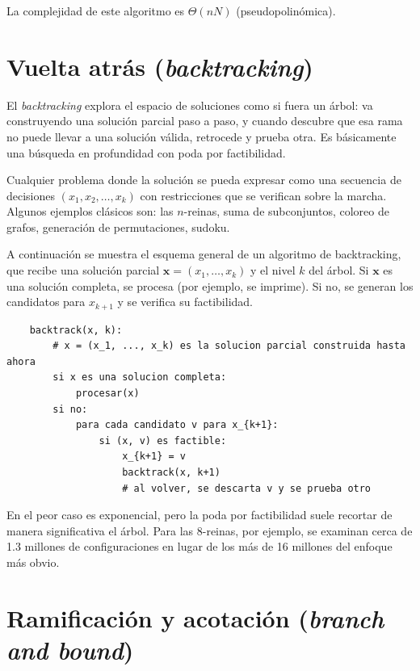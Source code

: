\documentclass[12pt,letterpaper]{article}
\begin{document}
La complejidad de este algoritmo es $\Theta(nN)$ (pseudopolinómica). 

\section{Vuelta atrás (\emph{backtracking})}
\label{sec:back}

El \emph{backtracking} explora el espacio de soluciones como si fuera un árbol: 
va construyendo una solución parcial paso a paso, y cuando descubre que esa 
rama no puede llevar a una solución válida, retrocede y prueba otra. Es 
básicamente una búsqueda en profundidad con poda por factibilidad.

Cualquier problema donde la solución se pueda expresar como una secuencia de 
decisiones $(x_1,x_2,\dots,x_k)$ con restricciones que se verifican sobre la 
marcha. Algunos ejemplos clásicos son: las $n$-reinas, suma de subconjuntos, 
coloreo de grafos, generación de permutaciones, sudoku.

A continuación se muestra el esquema general de un algoritmo de backtracking, 
que recibe una solución parcial $\mathbf{x}=(x_1,\dots,x_k)$ y el nivel $k$ del 
árbol. Si $\mathbf{x}$ es una solución completa, se procesa (por ejemplo, se 
imprime). Si no, se generan los candidatos para $x_{k+1}$ y se verifica su 
factibilidad.

\begin{verbatim}
    backtrack(x, k):
        # x = (x_1, ..., x_k) es la solucion parcial construida hasta ahora
        si x es una solucion completa:
            procesar(x)
        si no:
            para cada candidato v para x_{k+1}:
                si (x, v) es factible:
                    x_{k+1} = v
                    backtrack(x, k+1)
                    # al volver, se descarta v y se prueba otro
\end{verbatim}

En el peor caso es exponencial, pero la poda por factibilidad suele recortar 
de manera significativa el árbol. Para las 8-reinas, por ejemplo, se examinan 
cerca de 1.3 millones de configuraciones en lugar de los más de 16 millones del 
enfoque más obvio.

\section{Ramificación y acotación (\emph{branch and bound})}
\label{sec:bnb}
\end{document}
